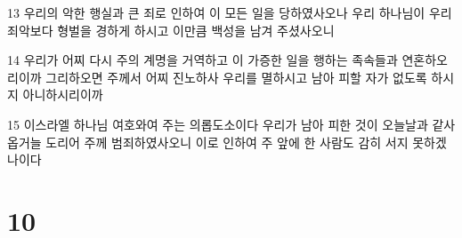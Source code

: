 \par 13 우리의 악한 행실과 큰 죄로 인하여 이 모든 일을 당하였사오나 우리 하나님이 우리 죄악보다 형벌을 경하게 하시고 이만큼 백성을 남겨 주셨사오니
\par 14 우리가 어찌 다시 주의 계명을 거역하고 이 가증한 일을 행하는 족속들과 연혼하오리이까 그리하오면 주께서 어찌 진노하사 우리를 멸하시고 남아 피할 자가 없도록 하시지 아니하시리이까
\par 15 이스라엘 하나님 여호와여 주는 의롭도소이다 우리가 남아 피한 것이 오늘날과 같사옵거늘 도리어 주께 범죄하였사오니 이로 인하여 주 앞에 한 사람도 감히 서지 못하겠나이다

\chapter{10}

